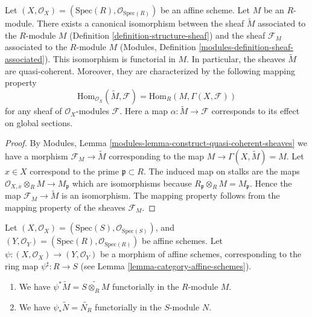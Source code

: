 \begin{lemma}
\label{lemma-compare-constructions}
Let $(X, \mathcal{O}_X) = (\text{Spec}(R), \mathcal{O}_{\text{Spec}(R)})$
be an affine scheme. Let $M$ be an $R$-module. There exists a canonical
isomorphism between the sheaf $\widetilde M$ associated to the $R$-module
$M$ (Definition \ref{definition-structure-sheaf}) and the sheaf
$\mathcal{F}_M$ associated to the $R$-module $M$
(Modules, Definition \ref{modules-definition-sheaf-associated}).
This isomorphism is functorial in $M$. In particular,
the sheaves $\widetilde M$ are quasi-coherent. Moreover, they
are characterized by the following mapping property
$$
\text{Hom}_{\mathcal{O}_X}(\widetilde M, \mathcal{F})
=
\text{Hom}_R(M, \Gamma(X, \mathcal{F}))
$$
for any sheaf of $\mathcal{O}_X$-modules $\mathcal{F}$.
Here a map $\alpha : \widetilde M \to \mathcal{F}$ corresponds
to its effect on global sections.
\end{lemma}

\begin{proof}
By Modules, Lemma \ref{modules-lemma-construct-quasi-coherent-sheaves}
we have a morphism $\mathcal{F}_M \to \widetilde M$ corresponding
to the map $M \to \Gamma(X, \widetilde M) = M$. Let $x \in X$
correspond to the prime $\mathfrak p \subset R$.
The induced map on stalks are the maps
$\mathcal{O}_{X, x} \otimes_R M \to M_{\mathfrak p}$
which are isomorphisms because
$R_{\mathfrak p} \otimes_R M = M_{\mathfrak p}$.
Hence the map $\mathcal{F}_M \to \widetilde M$ is an isomorphism.
The mapping property follows from the mapping property of
the sheaves $\mathcal{F}_M$.
\end{proof}

\begin{lemma}
\label{lemma-widetilde-pullback}
Let
$(X, \mathcal{O}_X) = (\text{Spec}(S), \mathcal{O}_{\text{Spec}(S)})$,
and
$(Y, \mathcal{O}_Y) = (\text{Spec}(R), \mathcal{O}_{\text{Spec}(R)})$
be affine schemes.
Let $\psi : (X, \mathcal{O}_X) \to (Y, \mathcal{O}_Y)$ be a
morphism of affine schemes, corresponding to the ring map
$\psi^\sharp : R \to S$ (see Lemma \ref{lemma-category-affine-schemes}).
\begin{enumerate}
\item We have $\psi^* \widetilde M = \widetilde{S\otimes_R M}$
functorially in the $R$-module $M$.
\item We have $\psi_* \widetilde N = \widetilde{N_R}$ functorially
in the $S$-module $N$.
\end{enumerate}
\end{lemma}

